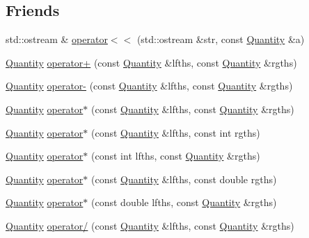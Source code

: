 \subsection*{Friends}
\begin{DoxyCompactItemize}
\item 
std\+::ostream \& \hyperlink{classmunits_1_1_quantity_a26328f678ccbddf64026c4f217938afb}{operator$<$$<$} (std\+::ostream \&str, const \hyperlink{classmunits_1_1_quantity}{Quantity} \&a)
\item 
\hyperlink{classmunits_1_1_quantity}{Quantity} \hyperlink{classmunits_1_1_quantity_a31795b0bdac61b168e21eb109d4f9909}{operator+} (const \hyperlink{classmunits_1_1_quantity}{Quantity} \&lfths, const \hyperlink{classmunits_1_1_quantity}{Quantity} \&rgths)
\item 
\hyperlink{classmunits_1_1_quantity}{Quantity} \hyperlink{classmunits_1_1_quantity_abcc9929246b92475a9008ed1a8b30160}{operator-\/} (const \hyperlink{classmunits_1_1_quantity}{Quantity} \&lfths, const \hyperlink{classmunits_1_1_quantity}{Quantity} \&rgths)
\item 
\hyperlink{classmunits_1_1_quantity}{Quantity} \hyperlink{classmunits_1_1_quantity_a590dff743167fea46e7b6e660fef0471}{operator$\ast$} (const \hyperlink{classmunits_1_1_quantity}{Quantity} \&lfths, const \hyperlink{classmunits_1_1_quantity}{Quantity} \&rgths)
\item 
\hyperlink{classmunits_1_1_quantity}{Quantity} \hyperlink{classmunits_1_1_quantity_a3b34f864a8d7dc26122650987a08db74}{operator$\ast$} (const \hyperlink{classmunits_1_1_quantity}{Quantity} \&lfths, const int rgths)
\item 
\hyperlink{classmunits_1_1_quantity}{Quantity} \hyperlink{classmunits_1_1_quantity_a537ae4feae57faf4d03626a02df64918}{operator$\ast$} (const int lfths, const \hyperlink{classmunits_1_1_quantity}{Quantity} \&rgths)
\item 
\hyperlink{classmunits_1_1_quantity}{Quantity} \hyperlink{classmunits_1_1_quantity_ab1bd381ef86466a48f2ed99d64a96141}{operator$\ast$} (const \hyperlink{classmunits_1_1_quantity}{Quantity} \&lfths, const double rgths)
\item 
\hyperlink{classmunits_1_1_quantity}{Quantity} \hyperlink{classmunits_1_1_quantity_a0f7ddd0457e20b83847135178d2d71f0}{operator$\ast$} (const double lfths, const \hyperlink{classmunits_1_1_quantity}{Quantity} \&rgths)
\item 
\hyperlink{classmunits_1_1_quantity}{Quantity} \hyperlink{classmunits_1_1_quantity_a7efa534b51546377b466e035f7ef1ea9}{operator/} (const \hyperlink{classmunits_1_1_quantity}{Quantity} \&lfths, const \hyperlink{classmunits_1_1_quantity}{Quantity} \&rgths)

\end{DoxyCompactItemize}

